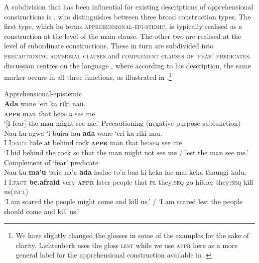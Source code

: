 \documentclass[output=paper,colorlinks,citecolor=brown]{langscibook}
\begin{document}
A subdivision that has been influential for existing descriptions of apprehensional constructions is , who distinguishes between three broad construction types. The first type, which he terms \textsc{apprehensional}-\textsc{epi-stemic}, is typically realised as a construction at the level of the main clause. The other two are realised at the level of subordinate constructions. These in turn are subdivided into \textsc{precautioning adverbial clauses} and \textsc{complement clauses of `fear' predicates}.  discussion centres on the  language , where according to his description, the same marker occurs in all three functions, as illustrated in .\footnote{We have slightly changed the glosses in some of the examples for the sake of clarity. Lichtenberk uses the gloss \textsc{lest} while we use \textsc{appr} here as a more general label for the apprehensional construction available in .}
\newpage

\ea 
\label{ex:intro4} 
\ea \label{ex:intro4a} \textnormal{Apprehensional-epistemic} \\
\gll \textbf{Ada} wane `eri ka riki nau. \\
\textbf{\textsc{appr}} man that he:\textsc{seq} see me \\
\glt `[I fear] the man might see me.'  
\ex \label{ex:intro4b} \textnormal{Precautioning (negative purpose subfunction)} \\
\gll Nau ku	agwa `i	buira fau \textbf{ada} wane `eri ka riki nau.\\
I I:\textsc{fact} hide at behind rock \textbf{\textsc{appr}} man that he:\textsc{seq} see me\\ 
\glt `I hid behind the rock so that the man might not see me / lest the man see me.' 
  \newpage  \ex \label{ex:intro4c} \textnormal{Complement of `fear' predicate} \\
\gll Nau ku \textbf{ma'u} {`asia na'a} \textbf{ada} laalae to'a baa ki keka lae	mai keka thaungi kulu.\\
I I:\textsc{fact} \textbf{be.afraid} very \textbf{\textsc{appr}} later people that \textsc{pl} they:\textsc{seq} go hither they:\textsc{seq} kill us(\textsc{incl}) \\
\glt `I am scared the people might come and kill us.' / `I am scared lest the people should come and kill us.'  \\
\z
\z
\end{document}
